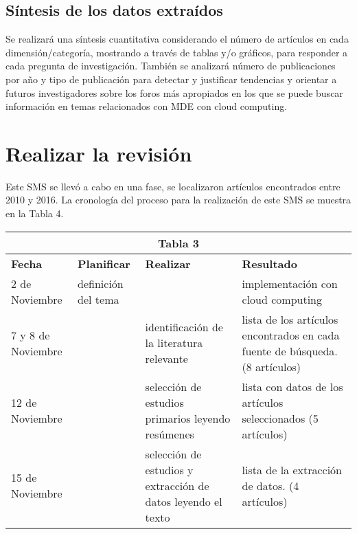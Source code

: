 \documentclass{llncs}
\begin{document}
\subsection{Síntesis de los datos extraídos}

Se realizará una síntesis cuantitativa considerando el número de artículos en cada dimensión/categoría, mostrando a través de tablas y/o gráficos, para responder a cada pregunta de investigación.
También se analizará número de publicaciones por año y tipo de publicación para detectar y justificar tendencias y orientar a futuros investigadores sobre los foros más apropiados en los que se puede buscar información en temas relacionados con MDE con cloud computing.
\clearpage
\section{Realizar la revisión}
Este SMS se llevó a cabo en una fase, se localizaron artículos encontrados entre 2010 y 2016. La cronología del proceso para la realización de este SMS se muestra en la Tabla 4. \\
\begin{tabular}{  | p{2cm} | p{3cm}  |  p{3cm} | p{3cm} |}
  \hline
  \multicolumn{4}{|c|}{\bf Tabla 3} \\
  \hline
  \bf Fecha  & \bf Planificar & \bf Realizar & \bf Resultado \\
  \hline
   2 de Noviembre  & definición del tema & & implementación con cloud computing\\
  \hline
   7 y 8 de Noviembre &  & identificación de la literatura relevante & lista de los artículos encontrados en cada fuente de búsqueda.(8 artículos)\\
   \hline
    12 de Noviembre  & & selección de estudios primarios leyendo resúmenes & lista con datos de los artículos seleccionados (5 artículos)\\
    \hline
     15 de Noviembre & & selección de estudios y extracción de datos leyendo el texto & lista de la extracción de datos. (4 artículos) \\
    \hline
 \end{tabular}
\end{document}
